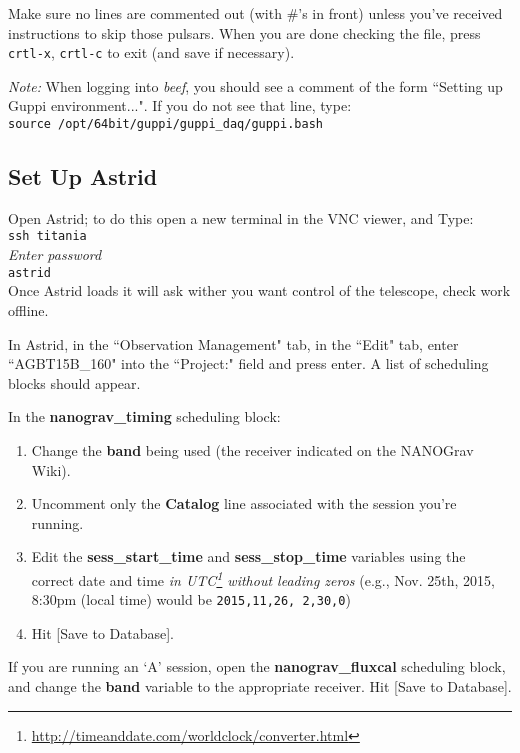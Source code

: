 \documentclass[11pt, reqno, tbtags]{article}
\begin{document}
\noindent Make sure no lines are commented out (with \#'s in front) unless you've received instructions to skip those pulsars. When you are done checking the file, press \texttt{crtl-x}, \texttt{crtl-c} to exit (and save if necessary).  

\noindent\textit{Note:} When logging into \textit{beef}, you should see a comment of the form ``Setting up Guppi environment...".  If you do not see that line, type: \\
\indent\texttt{source /opt/64bit/guppi/guppi\_daq/guppi.bash}

\subsection{Set Up Astrid}\label{ssec:astrid}  %
Open Astrid; to do this open a new terminal in the VNC viewer, and Type: \\
\indent\texttt{ssh titania} \\                   
\indent \emph{Enter password} \\
\indent\texttt{astrid} \\
Once Astrid loads it will ask wither you want control of the telescope, check work offline.

\noindent In Astrid, in the ``Observation Management" tab, in the ``Edit" tab, enter ``AGBT15B\_160" into the ``Project:" field and press enter. A list of scheduling blocks should appear. 

\noindent In the \textbf{nanograv\_timing} scheduling block: \begin{enumerate}
 \item Change the \textbf{band} being used (the receiver indicated on the NANOGrav Wiki).  
 \item Uncomment only the \textbf{Catalog} line associated with the session you're running.  
 \item Edit the \textbf{sess\_start\_time} and \textbf{sess\_stop\_time} variables using the correct date and time \textit{in UTC\footnote{\url{http://timeanddate.com/worldclock/converter.html}} without leading zeros} (e.g., Nov. 25th, 2015, 8:30pm (local time) would be \texttt{2015,11,26, 2,30,0}) 
 \item Hit [Save to Database].
\end{enumerate}

\noindent If you are running an `A' session, open the \textbf{nanograv\_fluxcal} scheduling block, and change the \textbf{band} variable to the appropriate receiver.  Hit [Save to Database].
\end{document}
